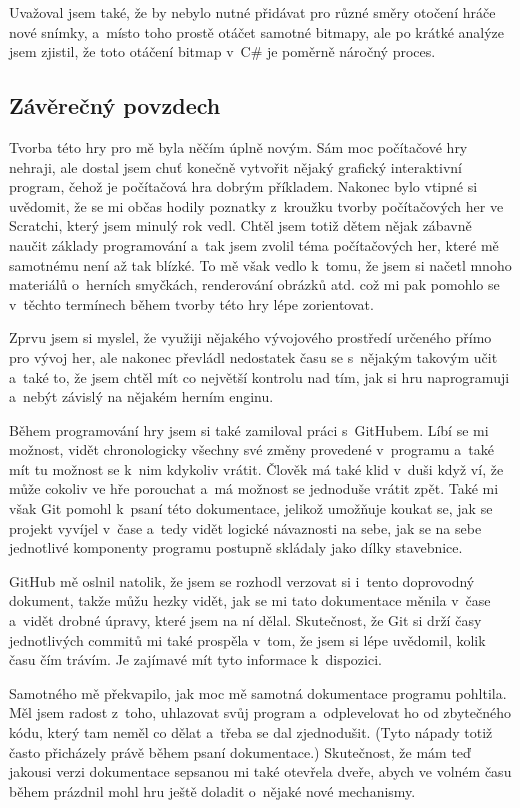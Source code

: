 \documentclass[a4]{article}
\begin{document}
Uvažoval jsem také, že by nebylo nutné přidávat pro různé směry otočení hráče nové snímky, a~místo toho prostě otáčet samotné bitmapy, ale po krátké analýze jsem zjistil, že toto otáčení bitmap v~C\# je poměrně náročný proces.

\subsection{Závěrečný povzdech}
Tvorba této hry pro mě byla něčím úplně novým. Sám moc počítačové hry nehraji, ale dostal jsem chuť konečně vytvořit nějaký grafický interaktivní program, čehož je počítačová hra dobrým příkladem. Nakonec bylo vtipné si uvědomit, že se mi občas hodily poznatky z~kroužku tvorby počítačových her ve Scratchi, který jsem minulý rok vedl. Chtěl jsem totiž dětem nějak zábavně naučit základy programování a~tak jsem zvolil téma počítačových her, které mě samotnému není až tak blízké. To mě však vedlo k~tomu, že jsem si načetl mnoho materiálů o~herních smyčkách, renderování obrázků atd. což mi pak pomohlo se v~těchto termínech během tvorby této hry lépe zorientovat. 

Zprvu jsem si myslel, že využiji nějakého vývojového prostředí určeného přímo pro vývoj her, ale nakonec převládl nedostatek času se s~nějakým takovým učit a~také to, že jsem chtěl mít co největší kontrolu nad tím, jak si hru naprogramuji a~nebýt závislý na nějakém herním enginu.

Během programování hry jsem si také zamiloval práci s~GitHubem. Líbí se mi možnost, vidět chronologicky všechny své změny provedené v~programu a~také mít tu možnost se k~nim kdykoliv vrátit. Člověk má také klid v~duši když ví, že může cokoliv ve hře porouchat a~má možnost se jednoduše vrátit zpět. Také mi však Git pomohl k~psaní této dokumentace, jelikož umožňuje koukat se, jak se projekt vyvíjel v~čase a~tedy vidět logické návaznosti na sebe, jak se na sebe jednotlivé komponenty programu postupně skládaly jako dílky stavebnice.

GitHub mě oslnil natolik, že jsem se rozhodl verzovat si i~tento doprovodný dokument, takže můžu hezky vidět, jak se mi tato dokumentace měnila v~čase a~vidět drobné úpravy, které jsem na ní dělal. Skutečnost, že Git si drží časy jednotlivých commitů mi také prospěla v~tom, že jsem si lépe uvědomil, kolik času čím trávím. Je zajímavé mít tyto informace k~dispozici.

Samotného mě překvapilo, jak moc mě samotná dokumentace programu pohltila. Měl jsem radost z~toho, uhlazovat svůj program a~odplevelovat ho od zbytečného kódu, který tam neměl co dělat a~třeba se dal zjednodušit. (Tyto nápady totiž často přicházely právě během psaní dokumentace.) Skutečnost, že mám teď jakousi verzi dokumentace sepsanou mi také otevřela dveře, abych ve volném času během prázdnil mohl hru ještě doladit o~nějaké nové mechanismy. 
\end{document}
